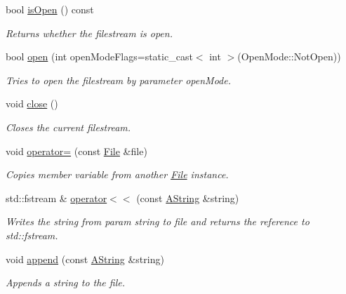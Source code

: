 \begin{DoxyCompactItemize}
bool \mbox{\hyperlink{class_file_abb0ce5b71ecf6fbaa538a812a622fc10}{is\+Open}} () const
\begin{DoxyCompactList}\small\item\em Returns whether the filestream is open. \end{DoxyCompactList}\item 
bool \mbox{\hyperlink{class_file_a119cd771053819d0c82f7cccefb511ef}{open}} (int open\+Mode\+Flags=static\+\_\+cast$<$ int $>$(Open\+Mode\+::\+Not\+Open))
\begin{DoxyCompactList}\small\item\em Tries to open the filestream by parameter open\+Mode. \end{DoxyCompactList}\item 
\mbox{\label{class_file_a83cbce54d6c3b8c2f417b51f6b3f488c}} 
void \mbox{\hyperlink{class_file_a83cbce54d6c3b8c2f417b51f6b3f488c}{close}} ()
\begin{DoxyCompactList}\small\item\em Closes the current filestream. \end{DoxyCompactList}\item 
\mbox{\label{class_file_a90d8fdab01cefa95038ac94cf058e43b}} 
void \mbox{\hyperlink{class_file_a90d8fdab01cefa95038ac94cf058e43b}{operator=}} (const \mbox{\hyperlink{class_file}{File}} \&file)
\begin{DoxyCompactList}\small\item\em Copies member variable from another \mbox{\hyperlink{class_file}{File}} instance. \end{DoxyCompactList}\item 
std\+::fstream \& \mbox{\hyperlink{class_file_ac58f65f7af68645c95050e0faa296bcd}{operator$<$$<$}} (const \mbox{\hyperlink{class_a_string}{A\+String}} \&string)
\begin{DoxyCompactList}\small\item\em Writes the string from param string to file and returns the reference to std\+::fstream. \end{DoxyCompactList}\item 
void \mbox{\hyperlink{class_file_a7598c356f21d695e7e69fc523500588a}{append}} (const \mbox{\hyperlink{class_a_string}{A\+String}} \&string)
\begin{DoxyCompactList}\small\item\em Appends a string to the file. \end{DoxyCompactList}\item 

\end{DoxyCompactItemize}
